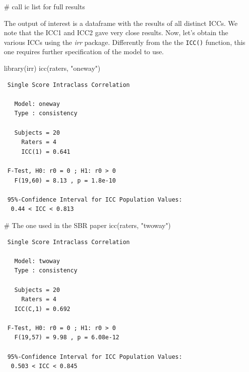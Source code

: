 \documentclass[
  letterpaper,
  DIV=11,
  numbers=noendperiod]{scrreprt}
\newenvironment{Shaded}{\begin{snugshade}}{\end{snugshade}}
\newcommand{\CommentTok}[1]{\textcolor[rgb]{0.37,0.37,0.37}{#1}}
\newcommand{\FunctionTok}[1]{\textcolor[rgb]{0.28,0.35,0.67}{#1}}
\newcommand{\NormalTok}[1]{\textcolor[rgb]{0.00,0.23,0.31}{#1}}
\newcommand{\StringTok}[1]{\textcolor[rgb]{0.13,0.47,0.30}{#1}}
\begin{document}
\begin{Shaded}
\begin{Highlighting}[]
\CommentTok{\# call ic list for full results}
\end{Highlighting}
\end{Shaded}

The output of interest is a dataframe with the results of all distinct
ICCs. We note that the ICC1 and ICC2 gave very close results. Now, let's
obtain the various ICCs using the \emph{irr} package. Differently from
the the \texttt{ICC()} function, this one requires further specification
of the model to use.

\begin{Shaded}
\begin{Highlighting}[]
\FunctionTok{library}\NormalTok{(irr)}
\FunctionTok{icc}\NormalTok{(raters, }\StringTok{"oneway"}\NormalTok{)}
\end{Highlighting}
\end{Shaded}

\begin{verbatim}
 Single Score Intraclass Correlation

   Model: oneway 
   Type : consistency 

   Subjects = 20 
     Raters = 4 
     ICC(1) = 0.641

 F-Test, H0: r0 = 0 ; H1: r0 > 0 
   F(19,60) = 8.13 , p = 1.8e-10 

 95%-Confidence Interval for ICC Population Values:
  0.44 < ICC < 0.813
\end{verbatim}

\begin{Shaded}
\begin{Highlighting}[]
\CommentTok{\# The one used in the SBR paper}
\FunctionTok{icc}\NormalTok{(raters, }\StringTok{"twoway"}\NormalTok{)}
\end{Highlighting}
\end{Shaded}

\begin{verbatim}
 Single Score Intraclass Correlation

   Model: twoway 
   Type : consistency 

   Subjects = 20 
     Raters = 4 
   ICC(C,1) = 0.692

 F-Test, H0: r0 = 0 ; H1: r0 > 0 
   F(19,57) = 9.98 , p = 6.08e-12 

 95%-Confidence Interval for ICC Population Values:
  0.503 < ICC < 0.845
\end{verbatim}
\end{document}
